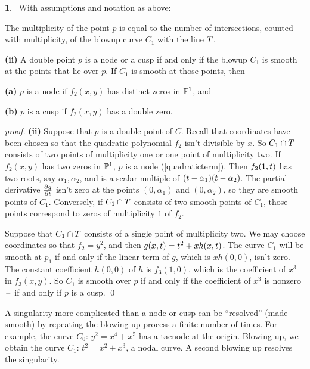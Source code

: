 \documentclass[leqno]{book}
\newcommand\Marginnote[1]{\marginnote{\hspace{-12pt}\normalfont{#1}}}
\theoremstyle{definition}%
\numberwithin{equation}{section}
\theoremstyle{theorem} %
\newtheorem{proposition}[equation]{}
\renewenvironment{proof}{\no \emph{proof.}}{}
\begin{document}
\begin{proposition}{}\Marginnote{blowupcusp}\;\,
With assumptions and notation as above:

 The multiplicity of the point $p$ is equal to the number
of intersections, counted with multiplicity, of the blowup curve $C_1$
with the line $T$.

\no
{\bf (ii)} A double point $p$ is a node
or a cusp if and only if the blowup $C_1$ is smooth at the points
that lie over $p$.  If $C_1$ is smooth at those points, then

 {\bf (a)}\; $p$ is a node if $f_2(x,y)$ has distinct zeros in $\mathbb{P}^1$,  and

 {\bf (b)}\;  $p$ is a cusp if $f_2(x,y)$ has a double zero.
\label{blowupcusp} \end{proposition}


\begin{proof}  {\bf (ii)}
Suppose that $p$ is a double point of $C$. Recall that coordinates have
been chosen so that the quadratic polynomial $f_2$ isn't divisible by
$x$.  So $C_1\cap T$ consists of two points of multiplicity one or
one point of multiplicity two.  If $f_2(x,y)$ has two zeros in
$\mathbb{P}^1$, $p$ is a node (\ref{quadraticterm}).  Then $f_2(1,t)$ has
two roots, say $\alpha_1,\alpha_2$, and is a scalar multiple of
$(t-\alpha_1)(t-\alpha_2)$.  The partial derivative
$\frac{\partial g}{\partial t}$ isn't zero at the points
$(0,\alpha_1)$ and $(0,\alpha_2)$, so they are smooth points
of $C_1$.  Conversely, if $C_1\cap T$ consists of two smooth points
of $C_1$, those points correspond to zeros of multiplicity $1$ of
$f_2$.

Suppose that $C_1\cap T$ consists of a single point of multiplicity
two.  We may choose coordinates so that $f_2 = y^2$, and then
$g(x,t) = t^2 + xh(x,t)$.  The curve $C_1$ will be smooth at
$p_1$ if and only if the linear term of $g$, which is $xh(0,0)$, isn't
zero.  The constant coefficient $h(0,0)$ of $h$ is $f_3(1,0)$, which
is the coefficient of $x^3$ in $f_3(x,y)$.  So $C_1$ is smooth over
$p$ if and only if the coefficient of $x^3$ is nonzero \,--\, if and
only if $p$ is a cusp.  \qed\end{proof}


\ms A singularity more complicated than a node or cusp can be
``resolved'' (made smooth) by repeating the blowing up process a
finite number of times.  For example, the curve $C_0$: $y^2=x^4+x^5$
has a tacnode at the origin.  Blowing up, we obtain the curve $C_1$:
$t^2 = x^2+x^3$, a nodal curve.  A second blowing up resolves the
singularity.
\end{document}
